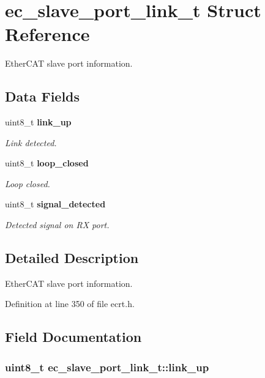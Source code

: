 \section{ec\-\_\-slave\-\_\-port\-\_\-link\-\_\-t \-Struct \-Reference}
\label{structec__slave__port__link__t}


\-Ether\-C\-A\-T slave port information.  


\subsection*{\-Data \-Fields}
\begin{DoxyCompactItemize}
\item 
uint8\-\_\-t {\bf link\-\_\-up}
\begin{DoxyCompactList}\small\item\em \-Link detected. \end{DoxyCompactList}\item 
uint8\-\_\-t {\bf loop\-\_\-closed}
\begin{DoxyCompactList}\small\item\em \-Loop closed. \end{DoxyCompactList}\item 
uint8\-\_\-t {\bf signal\-\_\-detected}
\begin{DoxyCompactList}\small\item\em \-Detected signal on \-R\-X port. \end{DoxyCompactList}\end{DoxyCompactItemize}


\subsection{\-Detailed \-Description}
\-Ether\-C\-A\-T slave port information. 

\-Definition at line 350 of file ecrt.\-h.



\subsection{\-Field \-Documentation}
\subsubsection[{link\-\_\-up}]{\setlength{\rightskip}{0pt plus 5cm}uint8\-\_\-t {\bf ec\-\_\-slave\-\_\-port\-\_\-link\-\_\-t\-::link\-\_\-up}}\label{structec__slave__port__link__t_a91706295ab6fa0761233b12a7e35d016}


